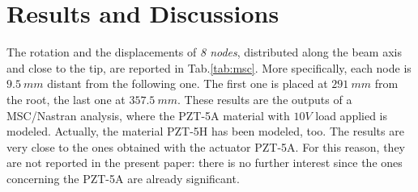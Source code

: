 \documentclass[twocolumn,a4paper,10pt,english]{article}
\begin{document}
\section{Results and Discussions}
The rotation and the displacements of \textit{8 nodes}, distributed along the beam axis and close to the tip, are reported in  Tab.\ref{tab:msc}. More specifically, each node is $9.5~mm$ distant from the following one. The first one is placed at $291~mm$ from the root, the last one at $357.5~mm$. 
These results are the outputs of a MSC/Nastran analysis, where the PZT-5A material with $10V$ load applied is modeled. Actually, the material PZT-5H has been modeled, too. The results are very close to the ones obtained with the actuator PZT-5A. For this reason, they are not reported in the present paper: there is no further interest since the ones concerning the PZT-5A are already significant.
\end{document}
